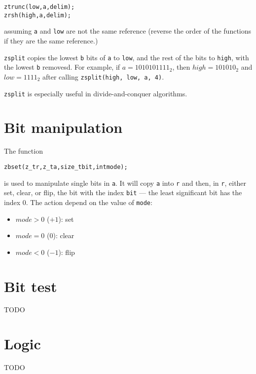 \begin{alltt}
   ztrunc(low, a, delim);
   zrsh(high, a, delim);
\end{alltt}

\noindent
assuming {\tt a} and {\tt low} are not the
same reference (reverse the order of the
functions if they are the same reference.)

{\tt zsplit} copies the lowest {\tt b} bits
of {\tt a} to {\tt low}, and the rest of the
bits to {\tt high}, with the lowest {\tt b}
removesd. For example, if $a = 1010101111_2$,
then $high = 101010_2$ and $low = 1111_2$
after calling {\tt zsplit(high, low, a, 4)}.

{\tt zsplit} is especially useful in
divide-and-conquer algorithms.


\newpage
\section{Bit manipulation}
\label{sec:Bit manipulation}


The function

\begin{alltt}
   zbset(z_t r, z_t a, size_t bit, int mode);
\end{alltt}

\noindent
is used to manipulate single bits in {\tt a}. It will
copy {\tt a} into {\tt r} and then, in {\tt r}, either
set, clear, or flip, the bit with the index {\tt bit}
— the least significant bit has the index 0. The
action depend on the value of {\tt mode}:

\begin{itemize}
\item
$mode > 0$ ($+1$): set
\item
$mode = 0$ ($0$): clear
\item
$mode < 0$ ($-1$): flip
\end{itemize}


\newpage
\section{Bit test}
\label{sec:Bit test}

TODO %


\newpage
\section{Logic}
\label{sec:Logic}

TODO %
